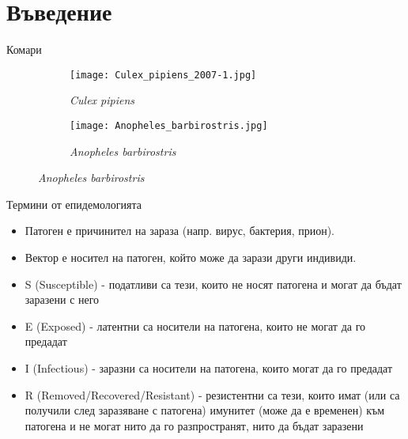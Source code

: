 \section{\hspace{1em}Въведение}
\begin{frame}[t]{Комари}
  \begin{figure}[h]
    \centering
    \begin{subfigure}{0.5\textwidth}
      \centering
      \texttt{[image: Culex\_pipiens\_2007-1.jpg]}
      \caption{\textit{Culex pipiens}}
      \label{fig:Culex}
    \end{subfigure}%
    \begin{subfigure}{0.5\textwidth}
      \centering
      \texttt{[image: Anopheles\_barbirostris.jpg]}
      \caption{\textit{Anopheles barbirostris}}
      \label{fig:Anopheles}
    \end{subfigure}
  \end{figure}
\end{frame}

\begin{frame}[t]{Термини от епидемологията}
  \begin{itemize}
    \item Патоген е причинител на зараза (напр. вирус, бактерия, прион).
    \item Вектор е носител на патоген, който може да зарази други индивиди.
    \item S (Susceptible) - податливи са тези, които не носят патогена и могат да бъдат заразени с него
    \item E (Exposed) - латентни са носители на патогена, които не могат да го предадат
    \item I (Infectious) - заразни са носители на патогена, които могат да го предадат
    \item R (Removed/Recovered/Resistant) - резистентни са тези, които имат (или са получили след заразяване с патогена) имунитет (може да е временен) към патогена и не могат нито да го разпространят, нито да бъдат заразени
  \end{itemize}
\end{frame}

